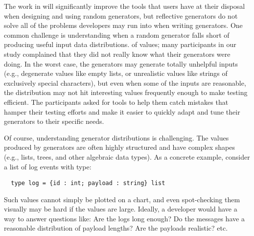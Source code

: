 The work in  will significantly improve the tools that users
have at their disposal when designing and using random generators, but
reflective generators do not solve all of the problems developers may run into
when writing generators. One common challenge is understanding when a random
generator falls short of producing useful input data distributions.  of values;
many participants in our study complained that they did not really know what
their generators were doing. In the worst case, the generators may generate
totally unhelpful inputs (e.g., degenerate values like empty lists, or
unrealistic values like strings of exclusively special characters), but even
when some of the inputs are reasonable, the distribution may not hit interesting
values frequently enough to make testing efficient.  The participants asked for
tools to help them catch mistakes that hamper their testing efforts and make it
easier to quickly adapt and tune their generators to their specific needs.

Of course, understanding generator distributions is challenging.  The values
produced by generators are often highly structured and have complex shapes
(e.g., lists, trees, and other algebraic data types). As a
concrete example,
\iflater
{}
\fi
consider a list of log events with type:
\begin{lstlisting}
  type log = {id : int; payload : string} list
\end{lstlisting}
Such values cannot simply be plotted on a chart, and even spot-checking them
visually may be hard if the values are large.
Ideally, a developer would have a way to answer questions like: Are the logs
long enough? Do the messages have a reasonable distribution of payload lengths?
Are the payloads realistic? etc.

